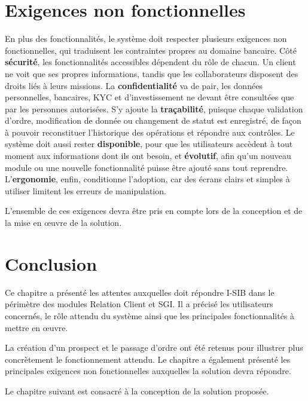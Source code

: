 \section{Exigences non fonctionnelles}

En plus des fonctionnalités, le système doit respecter plusieurs exigences non
fonctionnelles, qui traduisent les contraintes propres au domaine bancaire.
Côté \textbf{sécurité}, les fonctionnalités accessibles dépendent du rôle de
chacun. Un client ne voit que ses propres informations, tandis que les
collaborateurs disposent des droits liés à leurs missions. La
\textbf{confidentialité} va de pair, les données personnelles, bancaires, KYC et
d'investissement ne devant être consultées que par les personnes autorisées.
S'y ajoute la \textbf{traçabilité}, puisque chaque validation d'ordre,
modification de donnée ou changement de statut est enregistré, de façon à
pouvoir reconstituer l'historique des opérations et répondre aux contrôles. Le
système doit aussi rester \textbf{disponible}, pour que les utilisateurs
accèdent à tout moment aux informations dont ils ont besoin, et
\textbf{évolutif}, afin qu'un nouveau module ou une nouvelle fonctionnalité
puisse être ajouté sans tout reprendre. L'\textbf{ergonomie}, enfin, conditionne
l'adoption, car des écrans clairs et simples à utiliser limitent les erreurs de
manipulation.

L'ensemble de ces exigences devra être pris en compte lors de la conception et de la mise en œuvre de la solution.


\section*{Conclusion}

Ce chapitre a présenté les attentes auxquelles doit répondre I-SIB dans le périmètre des modules Relation Client et SGI. Il a précisé les utilisateurs concernés, le rôle attendu du système ainsi que les principales fonctionnalités à mettre en œuvre.

La création d'un prospect et le passage d'ordre ont été retenus pour illustrer plus concrètement le fonctionnement attendu. Le chapitre a également présenté les principales exigences non fonctionnelles auxquelles la solution devra répondre.

Le chapitre suivant est consacré à la conception de la solution proposée.
